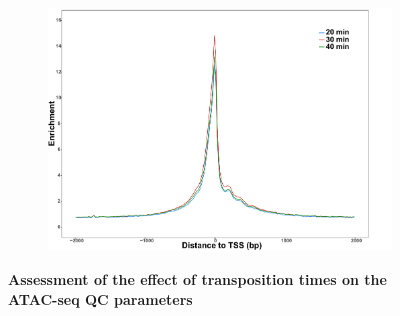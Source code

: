 \begin{figure}[htbp]
\begin{subfigure}{0.5\textwidth}
\centering
\includegraphics[width=\textwidth]{./Results1/pdfs/ATAC_optimisation_CD4_20_30_40_min_tss_enrichment}
\caption{\textbf{}} %
\end{subfigure}
\caption[Assessment of the effect of transposition times on the ATAC-seq QC parameters]{\textbf{Assessment of the effect of transposition times on the ATAC-seq QC parameters} \\
}
\label{fig:Transposition_times_ATAC}
\end{figure} 



